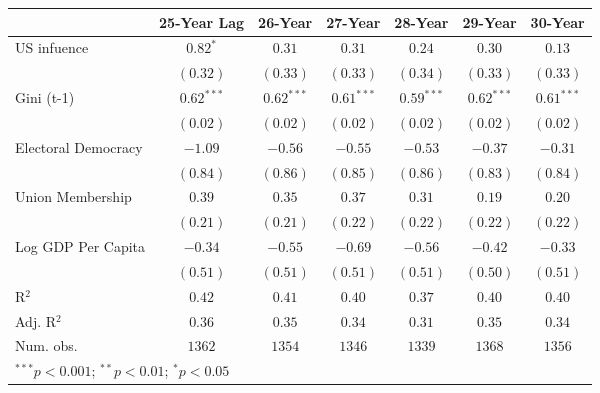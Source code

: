 
\begin{table}
\begin{center}
\begin{tabular}{l c c c c c c}
\toprule
 & 25-Year Lag & 26-Year & 27-Year & 28-Year & 29-Year & 30-Year \\
\midrule
US infuence         & $\mathbf{0.82}^{*}$   & $0.31$                & $0.31$                & $0.24$                & $0.30$                & $0.13$                \\
                    & $(0.32)$              & $(0.33)$              & $(0.33)$              & $(0.34)$              & $(0.33)$              & $(0.33)$              \\
Gini (t-1)          & $\mathbf{0.62}^{***}$ & $\mathbf{0.62}^{***}$ & $\mathbf{0.61}^{***}$ & $\mathbf{0.59}^{***}$ & $\mathbf{0.62}^{***}$ & $\mathbf{0.61}^{***}$ \\
                    & $(0.02)$              & $(0.02)$              & $(0.02)$              & $(0.02)$              & $(0.02)$              & $(0.02)$              \\
Electoral Democracy & $-1.09$               & $-0.56$               & $-0.55$               & $-0.53$               & $-0.37$               & $-0.31$               \\
                    & $(0.84)$              & $(0.86)$              & $(0.85)$              & $(0.86)$              & $(0.83)$              & $(0.84)$              \\
Union Membership    & $0.39$                & $0.35$                & $0.37$                & $0.31$                & $0.19$                & $0.20$                \\
                    & $(0.21)$              & $(0.21)$              & $(0.22)$              & $(0.22)$              & $(0.22)$              & $(0.22)$              \\
Log GDP Per Capita  & $-0.34$               & $-0.55$               & $-0.69$               & $-0.56$               & $-0.42$               & $-0.33$               \\
                    & $(0.51)$              & $(0.51)$              & $(0.51)$              & $(0.51)$              & $(0.50)$              & $(0.51)$              \\
\midrule
R$^2$               & $0.42$                & $0.41$                & $0.40$                & $0.37$                & $0.40$                & $0.40$                \\
Adj. R$^2$          & $0.36$                & $0.35$                & $0.34$                & $0.31$                & $0.35$                & $0.34$                \\
Num. obs.           & $1362$                & $1354$                & $1346$                & $1339$                & $1368$                & $1356$                \\
\bottomrule
\multicolumn{7}{l}{\scriptsize{$^{***}p<0.001$; $^{**}p<0.01$; $^{*}p<0.05$}}
\end{tabular}
\label{table:coefficients}
\end{center}
\end{table}
